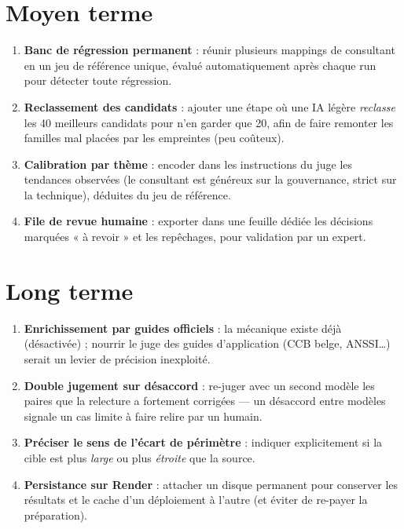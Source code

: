 \documentclass[11pt,a4paper]{report}
\begin{document}
\section{Moyen terme}
\begin{enumerate}[nosep]
  \item \textbf{Banc de régression permanent} : réunir plusieurs mappings de consultant en un jeu de référence unique, évalué automatiquement après chaque run pour détecter toute régression.
  \item \textbf{Reclassement des candidats} : ajouter une étape où une IA légère \emph{reclasse} les 40 meilleurs candidats pour n'en garder que 20, afin de faire remonter les familles mal placées par les empreintes (peu coûteux).
  \item \textbf{Calibration par thème} : encoder dans les instructions du juge les tendances observées (le consultant est généreux sur la gouvernance, strict sur la technique), déduites du jeu de référence.
  \item \textbf{File de revue humaine} : exporter dans une feuille dédiée les décisions marquées « à revoir » et les repêchages, pour validation par un expert.
\end{enumerate}

\section{Long terme}
\begin{enumerate}[nosep]
  \item \textbf{Enrichissement par guides officiels} : la mécanique existe déjà (désactivée) ; nourrir le juge des guides d'application (CCB belge, ANSSI\ldots) serait un levier de précision inexploité.
  \item \textbf{Double jugement sur désaccord} : re-juger avec un second modèle les paires que la relecture a fortement corrigées --- un désaccord entre modèles signale un cas limite à faire relire par un humain.
  \item \textbf{Préciser le sens de l'écart de périmètre} : indiquer explicitement si la cible est plus \emph{large} ou plus \emph{étroite} que la source.
  \item \textbf{Persistance sur Render} : attacher un disque permanent pour conserver les résultats et le cache d'un déploiement à l'autre (et éviter de re-payer la préparation).
\end{enumerate}

\appendix
\end{document}
